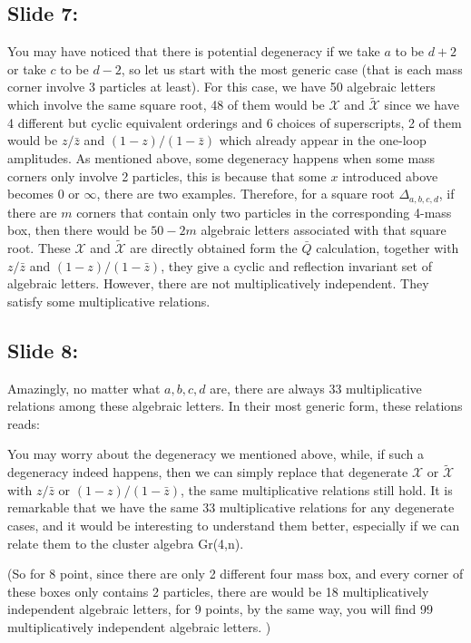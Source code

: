 \documentclass[a4paper,11pt]{article}
\begin{document}
\subsection{Slide 7:}

You may have noticed that there is potential degeneracy if we take $a$ to be $d+2$ or take $c$ to be $d-2$, so let us start with the most generic case (that is each mass corner involve 3 particles at least). For this case, we have 50 algebraic letters which involve the same square root, 48 of them would be $\mathcal{X}$ and $\tilde{\mathcal{X}}$ since we have 4 different but cyclic equivalent orderings and 6 choices of superscripts, 2 of them would be $z/\bar{z}$ and $(1-z)/(1-\bar{z})$ which already appear in the one-loop amplitudes. As mentioned above, some degeneracy happens when some mass corners only involve 2 particles, this is because that some $x$ introduced above becomes 0 or $\infty$, there are two examples.  Therefore, for a square root $\Delta_{a,b,c,d}$,  if there are $m$ corners that contain only two particles in the corresponding 4-mass box, then there would be $50-2m$ algebraic letters associated with that square root. These $\mathcal{X}$ and $\tilde{\mathcal{X}}$ are directly obtained form the $\bar{Q}$ calculation, together with $z/\bar{z}$ and $(1-z)/(1-\bar{z})$, they give a cyclic and reflection invariant set of algebraic letters. However, there are not multiplicatively independent.  They satisfy some multiplicative relations.


\subsection{Slide 8:}

Amazingly, no matter what $a,b,c,d$ are, there are always 33 multiplicative relations among these algebraic letters. In their most generic form, these relations reads:

You may worry about the degeneracy we mentioned above, while, if such a degeneracy indeed happens, then we can simply replace that degenerate $\mathcal{X}$ or $\tilde{\mathcal{X}}$ with $z/\bar{z}$ or $(1-z)/(1-\bar{z})$, the same multiplicative relations still hold. It is remarkable that we have the same 33 multiplicative relations for any degenerate cases, and it would be interesting to understand them better, especially if we can relate them to the cluster algebra Gr(4,n).

(So for 8 point, since there are only 2 different four mass box, and every corner of these boxes only contains 2 particles, there are would be 18 multiplicatively independent algebraic letters, for 9 points, by the same way, you will find 99 multiplicatively independent algebraic letters.  )
\end{document}
